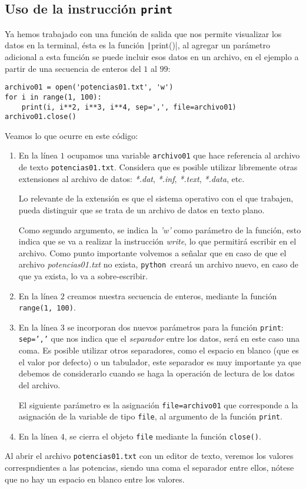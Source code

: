 \documentclass[12pt]{article}
\newcommand{\python}{\texttt{python}}
\begin{document}
\subsection{Uso de la instrucción \texttt{print}}
Ya hemos trabajado con una función de salida que nos permite visualizar los datos en la terminal, ésta es la función \texttt|print()|, al agregar un parámetro adicional a esta función se puede incluir esos datos en un archivo, en el ejemplo a partir de una secuencia de enteros del $1$ al $99$:
\begin{verbatim}
archivo01 = open('potencias01.txt', 'w')
for i in range(1, 100):
    print(i, i**2, i**3, i**4, sep=',', file=archivo01)
archivo01.close()    
\end{verbatim}
Veamos lo que ocurre en este código:
\begin{enumerate}
\item En la línea $1$ ocupamos una variable \texttt{archivo01} que hace referencia al archivo de texto \texttt{potencias01.txt}. Considera que es posible utilizar libremente otras extensiones al archivo de datos: \emph{*.dat}, \emph{*.inf}, \emph{*.text}, \emph{*.data}, etc.
\par
Lo relevante de la extensión es que el sistema operativo con el que trabajen, pueda distinguir que se trata de un archivo de datos en texto plano.
\par
Como segundo argumento, se indica la \textit{'w'} como parámetro de la función, esto indica que se va a realizar la instrucción \textit{write}, lo que permitirá escribir en el archivo. Como punto importante volvemos a señalar que en caso de que el archivo \textit{potencias01.txt} no exista, \python\ creará un archivo nuevo, en caso de que ya exista, lo va a sobre-escribir.
\item En la línea $2$ creamos nuestra secuencia de enteros, mediante la función \texttt{range(1, 100)}.
\item En la línea $3$ se incorporan dos nuevos parámetros para la función \texttt{print}: \texttt{sep=','} que nos indica que el \emph{separador} entre los datos, será en este caso una coma. Es posible utilizar otros separadores, como el espacio en blanco (que es el valor por defecto) o un tabulador, este separador es muy importante ya que debemos de considerarlo cuando se haga la operación de lectura de los datos del archivo.
\par
El siguiente parámetro es la asignación \texttt{file=archivo01} que corresponde a la asignación de la variable de tipo \texttt{file}, al argumento de la función \texttt{print}.
\item En la línea $4$, se cierra el objeto \texttt{file} mediante la función \texttt{close()}.
\end{enumerate}
Al abrir el archivo \texttt{potencias01.txt} con un editor de texto, veremos los valores correspndientes a las potencias, siendo una coma el separador entre ellos, nótese que no hay un espacio en blanco entre los valores.
\end{document}
